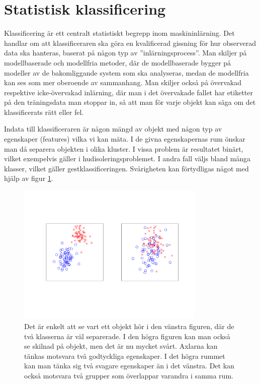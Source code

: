 \documentclass[../rapport_MVEX01-11-05]{subfiles}
\begin{document}
\section{Statistisk klassificering}\label{sec:klassificering}

Klassificering är ett centralt statistiskt begrepp inom maskininlärning.
Det handlar om att klassificeraren ska göra en kvalificerad gissning för hur
observerad data ska hanteras, baserat på någon typ av ''inlärningsprocess''.
Man skiljer på modellbaserade och modellfria metoder, där de modellbaserade
bygger på modeller av de bakomliggande system som ska analyseras, medan de
modellfria kan ses som mer oberoende av sammanhang.
Man skiljer också på övervakad respektive icke-övervakad inlärning,
där man i det övervakade fallet har etiketter på den träningsdata man stoppar
in, så att man för varje objekt kan säga om det klassificerats rätt eller fel.

Indata till klassificeraren är någon mängd av objekt med någon typ av egenskaper
(features) vilka vi kan mäta. I de givna egenskapernas rum önskar man då
separera objekten i olika kluster. I vissa problem är resultatet binärt,
vilket exempelvis gäller i hudisoleringsproblemet.
I andra fall väljs bland många klasser, vilket gäller gestklassificeringen.
Svårigheten kan förtydligas något med hjälp av figur \ref{fig:kluster}.
\begin{figure}[!htpb]
    \begin{center}
\includegraphics[width=0.8\textwidth,clip=true,trim=2cm 3cm 1.5cm 3cm]{bilder/kluster.pdf}
    \end{center}
    \caption{Det är enkelt att se vart ett objekt hör i den vänstra figuren,
    där de två klasserna är väl separerade. I den högra figuren kan man också se
    skilnad på objekt, men det är nu mycket svårt. Axlarna kan tänkas motsvara
    två godtyckliga egenskaper. I det högra rummet kan man tänka sig två svagare
    egenskaper än i det vänstra. Det kan också motsvara två grupper som
    överlappar varandra i samma rum.}
    \label{fig:kluster}
\end{figure}
\end{document}
